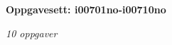 \centerline{\bf Oppgavesett: i00701no-i00710no}
\vskip 10pt
\centerline{\it 10 oppgaver}\vskip 10pt
\vskip 10pt
